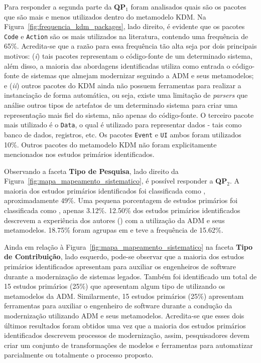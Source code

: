 Para responder a segunda parte da \textbf{QP$_1$} foram analisados quais são os pacotes que são mais e menos utilizados dentro do metamodelo KDM. Na Figura~\ref{fig:frequencia_kdm_packages}, lado direito, é evidente que os pacotes \texttt{Code} e \texttt{Action} são os mais utilizados na literatura, contendo uma frequência de 65\%. Acredita-se que a razão para essa frequência tão alta seja por dois principais motivos: (\textit{i}) tais pacotes representam o código-fonte de um determinado sistema, além disso, a maioria das abordagens identificadas utiliza como entrada o código-fonte de sistemas que almejam modernizar seguindo a ADM e seus metamodelos; e (\textit{ii}) outros pacotes do KDM ainda não possuem ferramentas para realizar a instanciação de forma automática, ou seja, existe uma limitação de \textit{parsers} que análise outros tipos de artefatos de um determinado sistema para criar uma representação mais fiel do sistema, não apenas do código-fonte. O terceiro pacote mais utilizado é o \texttt{Data}, o qual é utilizado para representar dados - tais como banco de dados, registros, etc. Os pacotes \texttt{Event} e \texttt{UI} ambos foram utilizados 10\%. Outros pacotes do metamodelo KDM não foram explicitamente mencionados nos estudos primários identificados.

Observando a faceta \textbf{Tipo de Pesquisa}, lado direito da Figura~\ref{fig:mapa_mapeamento_sistematico}, é possível responder a \textbf{QP$_2$}. A maioria dos estudos primários identificados foi classificada como , aproximadamente 49\%. Uma pequena porcentagem de estudos primários foi classificada como , apenas 3.12\%. 12.50\% dos estudos primários identificados descrevem a experiência dos autores () com a utilização da ADM e seus metamodelos. 18.75\% foram agrupas em  e  teve a frequência de 15.62\%.

Ainda em relação à Figura~\ref{fig:mapa_mapeamento_sistematico} na faceta \textbf{Tipo de Contribuição}, lado esquerdo, pode-se observar que a maioria dos estudos primários identificados apresentam  para auxiliar os engenheiros de software durante a modernização de sistemas legados. Também foi identificado um total de 15 estudos primários (25\%) que apresentam algum tipo de  utilizando os metamodelos da ADM. Similarmente, 15 estudos primários (25\%) apresentam ferramentas para auxiliar o engenheiro de software durante a condução da modernização utilizando ADM e seus metamodelos. Acredita-se que esses dois últimos resultados foram obtidos uma vez que a maioria dos estudos primários identificados descrevem processos de modernização, assim, pesquisadores devem criar um conjunto de transformações de modelos e ferramentas para automatizar parcialmente ou totalmente o processo proposto.

